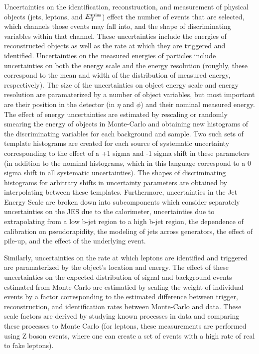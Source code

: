 Uncertainties on the identification, reconstruction, and measurement of physical objects (jets, leptons, and $E_{\mathrm{T}}^{\mathrm{miss}}$) effect the number of events that are selected, which channels those events may fall into, and the shape of discriminating variables within that channel.
These uncertainties include the energies of reconstructed objects as well as the rate at which they are triggered and identified.
Uncertainties on the measured energies of particles include uncertainties on both the energy scale and the energy resolution (roughly, these correspond to the mean and width of the distribution of measured energy, respectively).
The size of the uncertainties on object energy scale and energy resolution are paramaterized by a number of object variables, but most important are their position in the detector (in $\eta$ and $\phi$) and their nominal measured energy.
The effect of energy uncertainties are estimated by rescaling or randomly smearing the energy of objects in Monte-Carlo and obtaining new histograms of the discriminating variables for each background and sample.
Two such sets of template histograms are created for each source of systematic uncertainty corresponding to the effect of a +1 sigma and -1 sigma shift in these parameters (in addition to the nominal histograms, which in this language correspond to a 0 sigma shift in all systematic uncertainties).
The shapes of discriminating histograms for arbitrary shifts in uncertainty parameters are obtained by interpolating between these templates.
Furthermore, uncertainties in the Jet Energy Scale are broken down into subcomponents which consider separately uncertainties on the JES due to the calorimeter, uncertainties due to extrapolating from a low b-jet region to a high b-jet region, the dependence of calibration on pseudorapidity, the modeling of jets across generators, the effect of pile-up, and the effect of the underlying event.

Similarly, uncertainties on the rate at which leptons are identified and triggered are paramaterized by the object's location and energy.
The effect of these uncertainties on the expected distribution of signal and background events estimated from Monte-Carlo are estimatied by scaling the weight of individual events by a factor corresponding to the estimated difference between trigger, reconstruction, and identification rates between Monte-Carlo and data.
These scale factors are derived by studying known processes in data and comparing these processes to Monte Carlo (for leptons, these measurements are performed using Z boson events, where one can create a set of events with a high rate of real to fake leptons).

